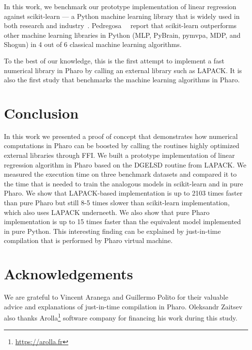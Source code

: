 \documentclass[]{ceurart}
\begin{document}
In this work, we benchmark our prototype implementation of linear regression against scikit-learn --- a Python machine learning library that is widely used in both research and industry~\cite{Lang19a}.
Pedregosa~\etal~\cite{Pedr11a} report that scikit-learn outperforms other machine learning libraries in Python (MLP, PyBrain, pymvpa, MDP, and Shogun) in 4 out of 6 classical machine learning algorithms.

To the best of our knowledge, this is the first attempt to implement a fast numerical library in Pharo by calling an external library such as LAPACK.
It is also the first study that benchmarks the machine learning algorithms in Pharo.


\section{Conclusion}
\label{sec:Conclusion}

In this work we presented a proof of concept that demonstrates how numerical computations in Pharo can be boosted by calling the routines highly optimized external libraries through FFI.
We built a prototype implementation of linear regression algorithm in Pharo based on the DGELSD routine from LAPACK.
We measured the execution time on three benchmark datasets and compared it to the time that is needed to train the analogous models in scikit-learn and in pure Pharo.
We show that LAPACK-based implementation is up to 2103 times faster than pure Pharo but still 8-5 times slower than scikit-learn implementation, which also uses LAPACK underneeth.
We also show that pure Pharo implementation is up to 15 times faster than the equivalent model implemented in pure Python.
This interesting finding can be explained by just-in-time compilation that is performed by Pharo virtual machine.

\section{Acknowledgements}

We are grateful to Vincent Aranega and Guillermo Polito for their valuable advice and explanations of just-in-time compilation in Pharo.
Oleksandr Zaitsev also thanks Arolla\footnote{\url{https://arolla.fr}} software company for financing his work during this study.



\end{document}
